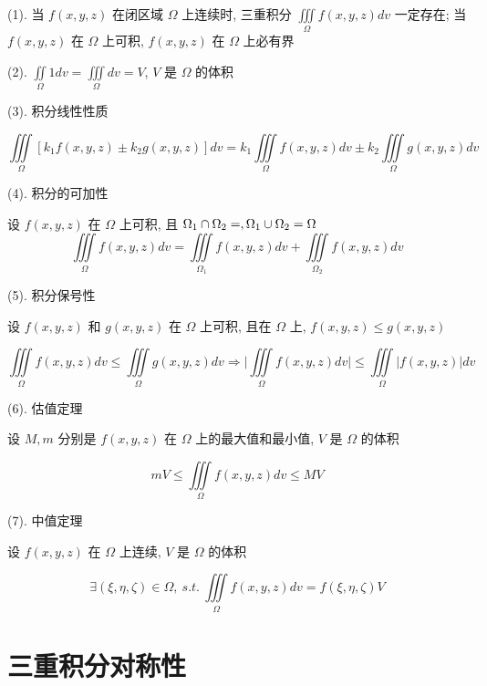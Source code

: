 \begin{corollary}

	(1). 当 $f(x,y,z)$ 在闭区域 $\Omega$ 上连续时, 三重积分 $\iiint\limits_{\Omega}f(x,y,z)dv$ 一定存在; 当 $f(x,y,z)$ 在 $\Omega$ 上可积, $f(x,y,z)$ 在 $\Omega$ 上必有界

	(2). $\iint\limits_{\Omega}1dv = \iiint\limits_{\Omega}dv = V$, $V$ 是 $\Omega$ 的体积

	(3). 积分线性性质

	$$\iiint\limits_{\Omega}\left[k_{1}f(x,y,z)\pm k_{2}g(x,y,z)\right] dv=k_{1}\iiint\limits_{\Omega}f(x,y,z)dv \pm k_{2}\iiint\limits_{\Omega}g(x,y,z)dv$$
	
	(4). 积分的可加性

	设 $f(x,y,z)$ 在 $\Omega$ 上可积, 且 $\Omega_{1} \cap \Omega_{2} = \empty, \Omega_{1} \cup \Omega_{2} =\Omega$
	$$\iiint\limits_{\Omega}f(x,y,z)dv = \iiint\limits_{\Omega_{1}}f(x,y,z)dv + \iiint\limits_{\Omega_{2}}f(x,y,z)dv $$

	(5). 积分保号性

	设 $f(x,y,z)$ 和 $g(x,y,z)$ 在 $\Omega$ 上可积, 且在 $\Omega$ 上, $f(x,y,z)\leq g(x,y,z)$

	$$\iiint\limits_{\Omega}f(x,y,z)dv \leq \iiint\limits_{\Omega}g(x,y,z)dv \Rightarrow \big|\iiint\limits_{\Omega}f(x,y,z)dv\big| \leq \iiint\limits_{\Omega}\big|f(x,y,z)\big|dv$$

	(6). 估值定理

	设 $M,m$ 分别是 $f(x,y,z)$ 在 $\Omega$ 上的最大值和最小值, $V$ 是 $\Omega$ 的体积
	
	$$mV \leq \iiint\limits_{\Omega}f(x,y,z)dv \leq MV$$

	(7). 中值定理

	设 $f(x,y,z)$ 在 $\Omega$ 上连续, $V$ 是 $\Omega$ 的体积

	$$\exists (\xi,\eta,\zeta) \in \Omega,\ s.t.\ \iiint\limits_{\Omega}f(x,y,z)dv = f(\xi,\eta,\zeta)V $$

\end{corollary}

\section{三重积分对称性}

